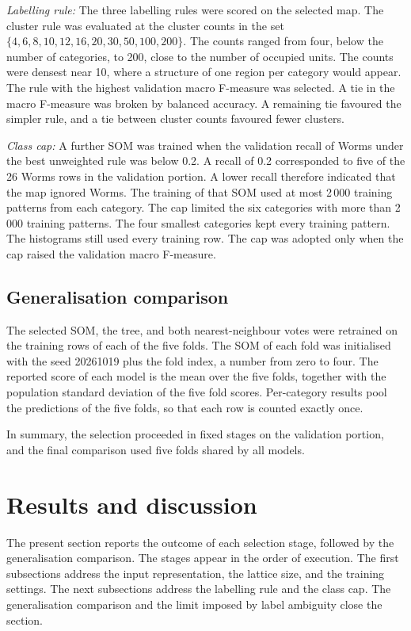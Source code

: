 \documentclass[conference,10pt]{IEEEtran}
\begin{document}
\emph{Labelling rule:}
The three labelling rules were scored on the selected map.
The cluster rule was evaluated at the cluster counts in the set $\{4,6,8,10,12,16,20,30,50,100,200\}$.
The counts ranged from four, below the number of categories, to 200, close to the number of occupied units.
The counts were densest near 10, where a structure of one region per category would appear.
The rule with the highest validation macro F-measure was selected.
A tie in the macro F-measure was broken by balanced accuracy.
A remaining tie favoured the simpler rule, and a tie between cluster counts favoured fewer clusters.

\emph{Class cap:}
A further SOM was trained when the validation recall of Worms under the best unweighted rule was below 0.2.
A recall of 0.2 corresponded to five of the 26 Worms rows in the validation portion.
A lower recall therefore indicated that the map ignored Worms.
The training of that SOM used at most 2\,000 training patterns from each category.
The cap limited the six categories with more than 2\,000 training patterns.
The four smallest categories kept every training pattern.
The histograms still used every training row.
The cap was adopted only when the cap raised the validation macro F-measure.

\subsection{Generalisation comparison}
The selected SOM, the tree, and both nearest-neighbour votes were retrained on the training rows of each of the five folds.
The SOM of each fold was initialised with the seed 20261019 plus the fold index, a number from zero to four.
The reported score of each model is the mean over the five folds, together with the population standard deviation of the five fold scores.
Per-category results pool the predictions of the five folds, so that each row is counted exactly once.

In summary, the selection proceeded in fixed stages on the validation portion, and the final comparison used five folds shared by all models.

\section{Results and discussion}
\label{sec:results}
The present section reports the outcome of each selection stage, followed by the generalisation comparison.
The stages appear in the order of execution.
The first subsections address the input representation, the lattice size, and the training settings.
The next subsections address the labelling rule and the class cap.
The generalisation comparison and the limit imposed by label ambiguity close the section.
\end{document}
